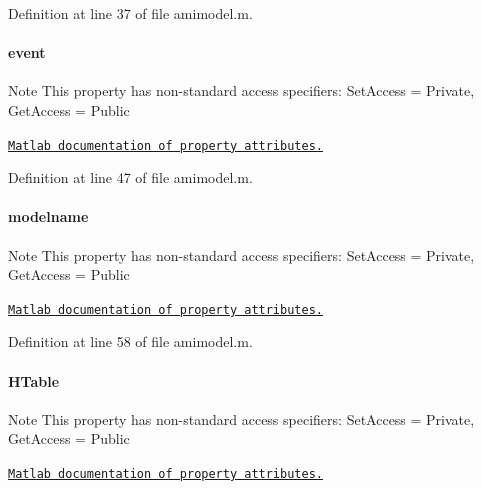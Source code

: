 Definition at line 37 of file amimodel.\+m.

\hypertarget{classamimodel_a3b65133bb9997cd1ccf311af0927fc9e}{}
\paragraph[{event}]{\setlength{\rightskip}{0pt plus 5cm}event}\label{classamimodel_a3b65133bb9997cd1ccf311af0927fc9e}
\begin{DoxyNote}{Note}
This property has non-\/standard access specifiers\+: {\ttfamily Set\+Access = Private, Get\+Access = Public} 

\href{http://www.mathworks.com/help/matlab/matlab_oop/property-attributes.html}{\tt Matlab documentation of property attributes.} 
\end{DoxyNote}


Definition at line 47 of file amimodel.\+m.

\hypertarget{classamimodel_a71bca9c21a6de42d8079ade31cb61044}{}
\paragraph[{modelname}]{\setlength{\rightskip}{0pt plus 5cm}modelname}\label{classamimodel_a71bca9c21a6de42d8079ade31cb61044}
\begin{DoxyNote}{Note}
This property has non-\/standard access specifiers\+: {\ttfamily Set\+Access = Private, Get\+Access = Public} 

\href{http://www.mathworks.com/help/matlab/matlab_oop/property-attributes.html}{\tt Matlab documentation of property attributes.} 
\end{DoxyNote}


Definition at line 58 of file amimodel.\+m.

\hypertarget{classamimodel_aafe6335df413dd688a2f44efba012cf1}{}
\paragraph[{H\+Table}]{\setlength{\rightskip}{0pt plus 5cm}H\+Table}\label{classamimodel_aafe6335df413dd688a2f44efba012cf1}
\begin{DoxyNote}{Note}
This property has non-\/standard access specifiers\+: {\ttfamily Set\+Access = Private, Get\+Access = Public} 

\href{http://www.mathworks.com/help/matlab/matlab_oop/property-attributes.html}{\tt Matlab documentation of property attributes.} 
\end{DoxyNote}


